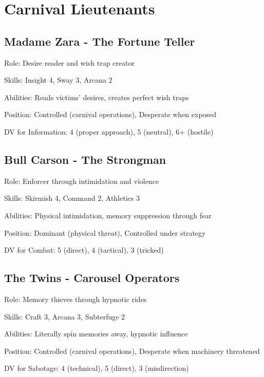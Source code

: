 \documentclass[11pt]{article}
\newenvironment{npc}[1]{\begin{description}[leftmargin=*,style=standard]\item[\textbf{#1}]}{\end{description}}
\begin{document}
\section{Carnival Lieutenants}

\subsection{Madame Zara - The Fortune Teller}
\begin{npc}{Madame Zara}
\item[Role:] Desire reader and wish trap creator
\item[Skills:] Insight 4, Sway 3, Arcana 2
\item[Abilities:] Reads victims' desires, creates perfect wish traps
\item[Position:] Controlled (carnival operations), Desperate when exposed
\item[DV for Information:] 4 (proper approach), 5 (neutral), 6+ (hostile)
\end{npc}

\subsection{Bull Carson - The Strongman}
\begin{npc}{Bull Carson}
\item[Role:] Enforcer through intimidation and violence
\item[Skills:] Skirmish 4, Command 2, Athletics 3
\item[Abilities:] Physical intimidation, memory suppression through fear
\item[Position:] Dominant (physical threat), Controlled under strategy
\item[DV for Combat:] 5 (direct), 4 (tactical), 3 (tricked)
\end{npc}

\subsection{The Twins - Carousel Operators}
\begin{npc}{The Twins}
\item[Role:] Memory thieves through hypnotic rides
\item[Skills:] Craft 3, Arcana 3, Subterfuge 2
\item[Abilities:] Literally spin memories away, hypnotic influence
\item[Position:] Controlled (carnival operations), Desperate when machinery threatened
\item[DV for Sabotage:] 4 (technical), 5 (direct), 3 (misdirection)
\end{npc}
\end{document}
